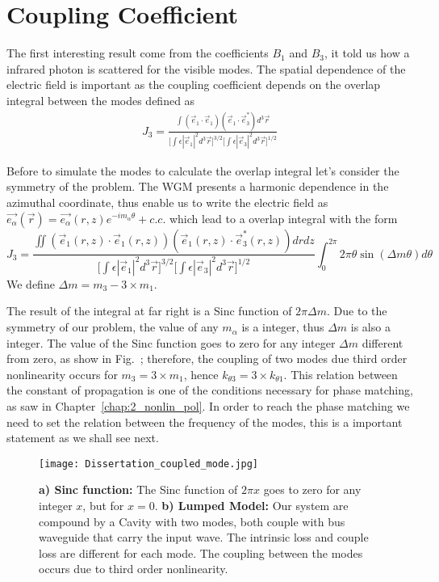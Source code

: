 \section{Coupling Coefficient}

The first interesting result come from the coefficients $B_1$ and $B_3$, it told us how a infrared photon is scattered for the visible modes. The spatial dependence of the electric field is important as the coupling coefficient depends on the overlap integral between the modes defined as 
\begin{eqnarray}
J_3 = \frac{\int
        (\vec{e}_1\cdot\vec{e}_1)(\vec{e}_1\cdot\vec{e}^*_3)
        d^3\vec{r}}{\Big[\int \epsilon|\vec{e}_1|^2 d^3\vec{r}\Big]^{3/2}\Big[\int \epsilon|\vec{e}_3|^2 d^3\vec{r}\Big]^{1/2}}
\end{eqnarray}

Before to simulate the modes to calculate the overlap integral let's consider the symmetry of the problem. The WGM presents a harmonic dependence in the azimuthal coordinate, thus enable us to write the electric field as $\vec{e_\alpha}(\vec{r}) = \vec{e_\alpha}(r,z)e^{-im_\alpha\theta}+c.c.$ which lead to a overlap integral with the form
\begin{equation}
    J_3 = \frac{\iint
        (\vec{e}_1(r,z)\cdot\vec{e}_1(r,z))(\vec{e}_1(r,z)\cdot\vec{e}^*_3(r,z))
        drdz}{\Big[\int \epsilon|\vec{e}_1|^2 d^3\vec{r}\Big]^{3/2}\Big[\int \epsilon|\vec{e}_3|^2 d^3\vec{r}\Big]^{1/2}} \int_0^{2\pi} 2\pi \theta \sin\left(\Delta m \theta\right)   d\theta
    \label{eq:overlap_j3}
\end{equation}
We define $\Delta m = m_3 -3\times m_1$. 

The result of the integral at far right is a Sinc function of $2\pi\Delta m$. Due to the symmetry of our problem, the value of any $m_\alpha$ is a integer, thus $\Delta m$ is also a integer. The value of the Sinc function goes to zero for any integer $\Delta m$ different from zero, as show in Fig.~; therefore, the coupling of two modes due third order nonlinearity occurs for $m_3 = 3\times m_1$, hence $k_{\theta3}= 3 \times k_{\theta1}$. This relation between the constant of propagation is one of the conditions necessary for phase matching, as saw in Chapter~\ref{chap:2_nonlin_pol}. In order to reach the phase matching we need to set the relation between the frequency of the modes, this is a important statement as we shall see next.  

\begin{figure}[t]
    \centering
    \texttt{[image: Dissertation\_coupled\_mode.jpg]}
    \caption{\textbf{a) Sinc function:} The Sinc function of $2\pi x$ goes to zero for any integer $x$, but for $x=0$. \textbf{b) Lumped Model:} Our system are compound by a Cavity with two modes, both couple with bus waveguide that carry the input wave. The intrinsic loss and couple loss are different for each mode. The coupling between the modes occurs due to third order nonlinearity. }
    \label{fig:toy_model}
\end{figure}

